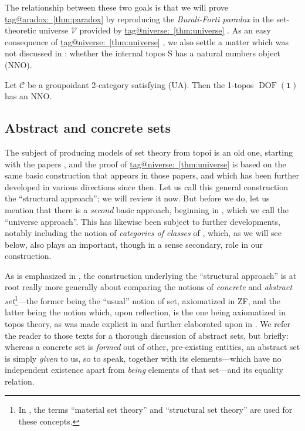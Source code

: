 \documentclass{amsart}
\makeatletter
\newcommand\cC{\mathcal{C}}
\newcommand\cV{\mathcal{V}}
\newcommand\DOF{\operatorname{DOF}}
\newcommand\rS{\mathrm{S}}
\newcommand\tm{\mathbf{1}}
\newcommand\tagword[1]{\csname tag@#1\endcsname}
\def\label@tag#1:#2\@nil{#1}
\newcommand\labeltag[1]{\label@tag#1:\@nil}
\newcommand\jref[1]{%
  \texorpdfstring%
    {\hyperref[#1]{\tagword{\labeltag{#1}}~\ref*{#1}}}%
    {\tagword{\labeltag{#1}}~\ref*{#1}}%
}
\theoremstyle{definition}
\theoremstyle{remark}
\theoremstyle{plainwithref}
\makeatother
\begin{document}
\noindent
The relationship between these two goals is that we will prove \jref{thm:paradox} by reproducing the \emph{Burali-Forti paradox} in the set-theoretic universe \( \cV \) provided by \jref{thm:universe}.
As an easy consequence of \jref{thm:universe}, we also settle a matter which was not discussed in \cite{helfer-topoi-in-topoi}: whether the internal topos \( \rS \) has a natural numbers object (NNO).

{
  \renewcommand\thedefn{C}
  \begin{cor}[see \jref{thm:infinity}]
    Let \( \cC \) be a groupoidant 2-category satisfying (UA).
    Then the 1-topos \( \DOF(\tm) \) has an NNO.
  \end{cor}
}

\subsection{Abstract and concrete sets} \label{subsec:abstract-concrete}
The subject of producing models of set theory from topoi is an old one, starting with the papers \cite{cole-categories_of_sets,mitchell-boolean-topoi}, and the proof of \jref{thm:universe} is based on the same basic construction that appears in those papers, and which has been further developed in various directions since then.
Let us call this general construction the ``structural approach''; we will review it now.
But before we do, let us mention that there is a \emph{second} basic approach, beginning in \cite{fourman-sheaf-models,hayashi-set-theories-in-toposes}, which we call the ``universe approach''.
This has likewise been subject to further developments, notably including the notion of \emph{categories of classes} of \cite{joyal-moerdijk-ast}, which, as we will see below, also plays an important, though in a sense secondary, role in our construction.

As is emphasized in \cite{shulman-comparing,makkai-abstract-sets}, the construction underlying the ``structural approach'' is at root really more generally about comparing the notions of \emph{concrete} and \emph{abstract set}\footnote{ %
  In \cite{shulman-comparing}, the terms ``material set theory'' and ``structural set theory'' are used for these concepts. %
}---the former being the ``usual'' notion of set, axiomatized in ZF, and the latter being the notion which, upon reflection, is the one being axiomatized in topos theory, as was made explicit in \cite{lawvere-variable} and further elaborated upon in \cite{makkai-abstract-sets}.
We refer the reader to those texts for a thorough discussion of abstract sets, but briefly: whereas a concrete set is \emph{formed} out of other, pre-existing entities, an abstract set is simply \emph{given} to us, so to speak, together with its elements---which have no independent existence apart from \emph{being} elements of that set---and its equality relation.
\end{document}
